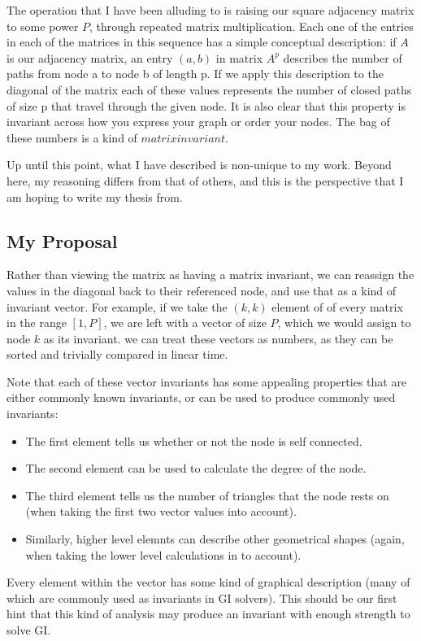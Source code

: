 \documentclass[a4paper,12pt]{article}
\begin{document}
The operation that I have been alluding to is raising our square adjacency
matrix to some power \(P\), through repeated matrix multiplication.
Each one of the entries in each of the matrices in this sequence has a simple conceptual description: if \(A\) is our adjacency matrix,
an entry \((a, b)\) in matrix \(A^p\) describes the number of paths from 
node a to node b of length p. If we apply this description to the diagonal of the matrix
each of these values represents the number of closed
paths of size p that travel through the given node.  It is also clear that this property is
invariant across how you express your graph or order your nodes. The bag of these numbers
is a kind of \(matrix invariant\).

Up until this point, what I have described is non-unique to my work.  Beyond here, my reasoning differs
from that of others, and this is the perspective that I am hoping to write my thesis from.

\subsection*{My Proposal}

Rather than viewing the matrix as having a matrix invariant, we can reassign
the values in the diagonal back to their referenced node, and use that as a kind
of invariant vector.  For example, if we take the \((k, k)\) element of of every matrix in
the range \([1, P]\), we are left with a vector of size \(P\), which we would assign to node \(k\)
as its invariant. we can treat these vectors as numbers, as they can be sorted and trivially compared
in linear time.

Note that each of these vector invariants has some appealing properties that are either commonly known
invariants, or can be used to produce commonly used invariants:
\begin{itemize}
 \item The first element tells us whether or not the node is self connected.
 \item The second element can be used to calculate the degree of the node.
 \item The third element tells us the number of triangles that the node rests on (when taking
the first two vector values into account).
\item Similarly, higher level elemnts can describe other geometrical shapes (again, when
taking the lower level calculations in to account).
\end{itemize}
Every element within the vector has  some kind of graphical description 
(many of which are commonly used as invariants in GI solvers). This should be our first hint that this
kind of analysis may produce an invariant with enough strength to solve GI.
\end{document}
